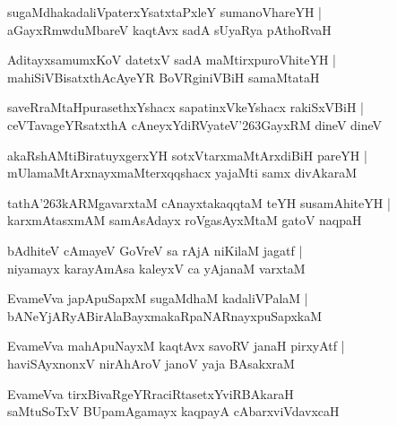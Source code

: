 \documentclass[twoside,12pt,openright]{book}
\def\S{\char'263}
\newcounter{shloka}[chapter]
\begin{document}
\begin{shloka}%
sugaMdhakadaliVpaterxYsatxtaPxleY sumanoVhareYH |\\
aGayxRmwduMbareV kaqtAvx sadA sUyaRya pAthoRvaH 
\end{shloka}

\begin{shloka}%
AditayxsamumxKoV datetxV sadA maMtirxpuroVhiteYH |\\
mahiSiVBisatxthAcAyeYR BoVRginiVBiH samaMtataH 
\end{shloka}

\begin{shloka}%
saveRraMtaHpurasethxYshacx sapatinxVkeYshacx rakiSxVBiH |\\
ceVTavageYRsatxthA cAneyxYdiRVyateV\S GayxRM dineV dineV 
\end{shloka}

\begin{shloka}%
akaRshAMtiBiratuyxgerxYH sotxVtarxmaMtArxdiBiH pareYH |\\
mUlamaMtArxnayxmaMterxqqshacx yajaMti samx divAkaraM 
\end{shloka}

\begin{shloka}%
tathA\S kARMgavarxtaM cAnayxtakaqqtaM teYH susamAhiteYH |\\
karxmAtasxmAM samAsAdayx roVgasAyxMtaM gatoV naqpaH 
\end{shloka}

\begin{shloka}%
bAdhiteV cAmayeV GoVreV sa rAjA niKilaM jagatf |\\
niyamayx karayAmAsa kaleyxV ca yAjanaM varxtaM 
\end{shloka}

\begin{shloka}%
EvameVva japApuSapxM sugaMdhaM kadaliVPalaM |\\
bANeYjARyABirAlaBayxmakaRpaNARnayxpuSapxkaM 
\end{shloka}

\begin{shloka}%
EvameVva mahApuNayxM kaqtAvx savoRV janaH pirxyAtf |\\
haviSAyxnonxV nirAhAroV janoV yaja BAsakxraM 
\end{shloka}

\begin{shloka}%
EvameVva tirxBivaRgeYRraciRtasetxYviRBAkaraH \\
saMtuSoTxV BUpamAgamayx kaqpayA cAbarxviVdavxcaH 
\end{shloka}
\end{document}
